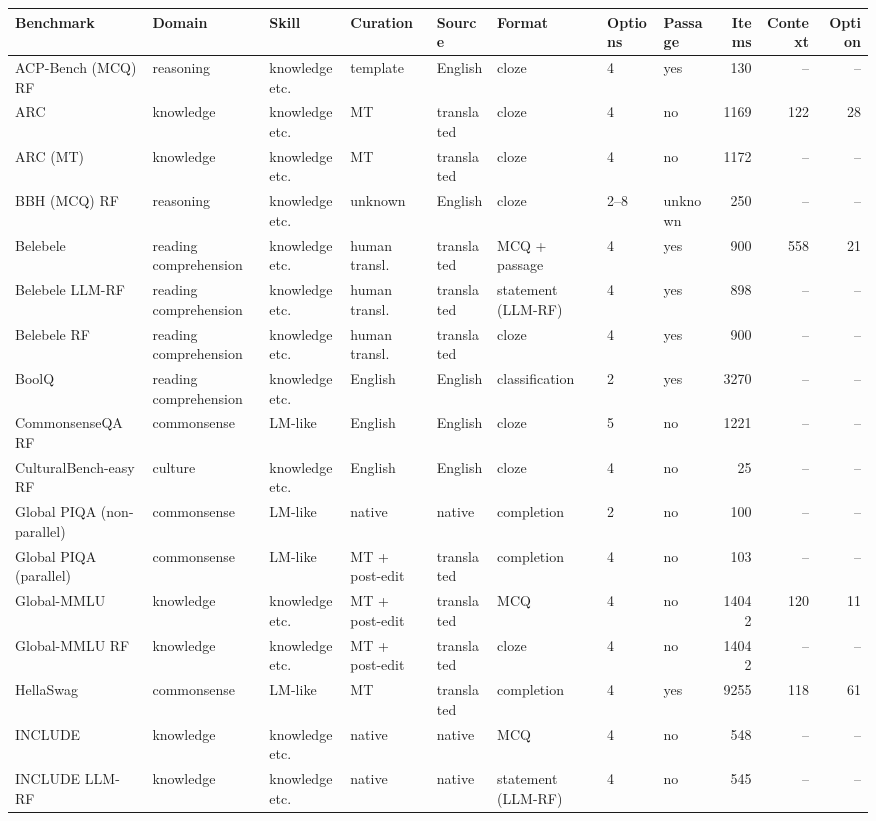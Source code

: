 \begin{tabular}{llllllllrrr}
\toprule
Benchmark & Domain & Skill & Curation & Source & Format & Options & Passage & Items & Context & Option \\
\midrule
ACP-Bench (MCQ) RF & reasoning & knowledge etc. & template & English & cloze & 4 & yes & 130 & -- & -- \\
ARC & knowledge & knowledge etc. & MT & translated & cloze & 4 & no & 1169 & 122 & 28 \\
ARC (MT) & knowledge & knowledge etc. & MT & translated & cloze & 4 & no & 1172 & -- & -- \\
BBH (MCQ) RF & reasoning & knowledge etc. & unknown & English & cloze & 2--8 & unknown & 250 & -- & -- \\
Belebele & reading comprehension & knowledge etc. & human transl. & translated & MCQ + passage & 4 & yes & 900 & 558 & 21 \\
Belebele LLM-RF & reading comprehension & knowledge etc. & human transl. & translated & statement (LLM-RF) & 4 & yes & 898 & -- & -- \\
Belebele RF & reading comprehension & knowledge etc. & human transl. & translated & cloze & 4 & yes & 900 & -- & -- \\
BoolQ & reading comprehension & knowledge etc. & English & English & classification & 2 & yes & 3270 & -- & -- \\
CommonsenseQA RF & commonsense & LM-like & English & English & cloze & 5 & no & 1221 & -- & -- \\
CulturalBench-easy RF & culture & knowledge etc. & English & English & cloze & 4 & no & 25 & -- & -- \\
Global PIQA (non-parallel) & commonsense & LM-like & native & native & completion & 2 & no & 100 & -- & -- \\
Global PIQA (parallel) & commonsense & LM-like & MT + post-edit & translated & completion & 4 & no & 103 & -- & -- \\
Global-MMLU & knowledge & knowledge etc. & MT + post-edit & translated & MCQ & 4 & no & 14042 & 120 & 11 \\
Global-MMLU RF & knowledge & knowledge etc. & MT + post-edit & translated & cloze & 4 & no & 14042 & -- & -- \\
HellaSwag & commonsense & LM-like & MT & translated & completion & 4 & yes & 9255 & 118 & 61 \\
INCLUDE & knowledge & knowledge etc. & native & native & MCQ & 4 & no & 548 & -- & -- \\
INCLUDE LLM-RF & knowledge & knowledge etc. & native & native & statement (LLM-RF) & 4 & no & 545 & -- & -- \\

\end{tabular}
